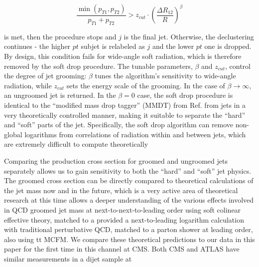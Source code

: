 \begin{equation}
  \frac{\min(p_{T1},p_{T2})}{p_{T1}+p_{T2}} > z_{cut} \cdot (\frac{\Delta R_{12}}{R})^\beta
\end{equation}

is met, then the procedure stops and $j$ is the final jet. Otherwise, the declustering continues - 
the higher $pt$ subjet is relabeled as $j$ and the lower $pt$ one is dropped.
By design, this condition fails for wide-angle soft radiation, which is therefore removed by the soft
drop procedure. The tunable parameters, $\beta$ and $z_{cut}$, control the degree of jet grooming:
$\beta$ tunes the algorithm's sensitivity to wide-angle radiation, while $z_{cut}$ sets the energy scale
of the grooming. In the case of $\beta \rightarrow \infty$, an ungroomed jet is returned. 
In the $\beta = 0$ case, the soft drop procedure is identical to the ``modified mass drop tagger'' (MMDT)
from Ref.
from jets in a very theoretically controlled manner, making it suitable to separate
the ``hard'' and ``soft'' parts of the jet. Specifically, the soft drop
algorithm can remove non-global logarithms from correlations of
radiation within and between jets, which are extremely difficult to
compute theoretically

Comparing the production cross section for groomed and ungroomed jets separately allows us to
gain sensitivity to both the ``hard'' and ``soft'' jet physics. 
The groomed cross section can be directly compared to theoretical calculations of the jet mass
now and in the future, which is a very active area of theoretical research
at this time
allows a deeper understanding of the various effects involved in QCD
groomed jet mass at next-to-next-to-leading order using soft colinear effective theory, matched to a
provided a next-to-leading logarithm calculation with traditional perturbative QCD, matched to a 
parton shower at leading order, also using {tt MCFM}.  We compare these theoretical predictions 
to our data in this paper for the first time in this channel at CMS. Both CMS and ATLAS have similar measurements in a dijet sample at %

